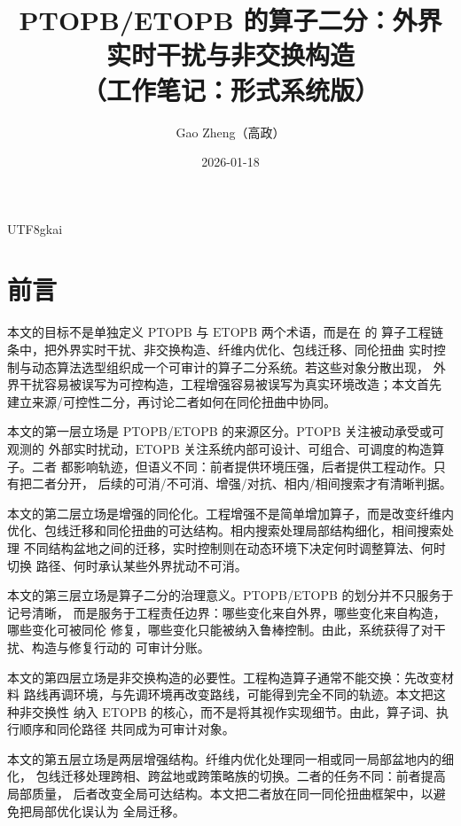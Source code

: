 \documentclass[12pt]{article}
\newcommand{\GFramework}{\text{G-Framework}}
\newcommand{\PTOPB}{\ensuremath{\mathrm{PTOPB}}}
\newcommand{\ETOPB}{\ensuremath{\mathrm{ETOPB}}}
\begin{document}
\begin{CJK*}{UTF8}{gkai}

\title{PTOPB/ETOPB 的算子二分：外界实时干扰与非交换构造\\（工作笔记：形式系统版）}
\author{Gao Zheng（高政）}
\date{2026-01-18}
\maketitle

\section*{前言}

本文的目标不是单独定义 \PTOPB{} 与 \ETOPB{} 两个术语，而是在 \GFramework{} 的
算子工程链条中，把外界实时干扰、非交换构造、纤维内优化、包线迁移、同伦扭曲
实时控制与动态算法选型组织成一个可审计的算子二分系统。若这些对象分散出现，
外界干扰容易被误写为可控构造，工程增强容易被误写为真实环境改造；本文首先
建立来源/可控性二分，再讨论二者如何在同伦扭曲中协同。

本文的第一层立场是 PTOPB/ETOPB 的来源区分。\PTOPB{} 关注被动承受或可观测的
外部实时扰动，\ETOPB{} 关注系统内部可设计、可组合、可调度的构造算子。二者
都影响轨迹，但语义不同：前者提供环境压强，后者提供工程动作。只有把二者分开，
后续的可消/不可消、增强/对抗、相内/相间搜索才有清晰判据。

本文的第二层立场是增强的同伦化。工程增强不是简单增加算子，而是改变纤维内
优化、包线迁移和同伦扭曲的可达结构。相内搜索处理局部结构细化，相间搜索处理
不同结构盆地之间的迁移，实时控制则在动态环境下决定何时调整算法、何时切换
路径、何时承认某些外界扰动不可消。

本文的第三层立场是算子二分的治理意义。PTOPB/ETOPB 的划分并不只服务于记号清晰，
而是服务于工程责任边界：哪些变化来自外界，哪些变化来自构造，哪些变化可被同伦
修复，哪些变化只能被纳入鲁棒控制。由此，系统获得了对干扰、构造与修复行动的
可审计分账。

本文的第四层立场是非交换构造的必要性。工程构造算子通常不能交换：先改变材料
路线再调环境，与先调环境再改变路线，可能得到完全不同的轨迹。本文把这种非交换性
纳入 \ETOPB{} 的核心，而不是将其视作实现细节。由此，算子词、执行顺序和同伦路径
共同成为可审计对象。

本文的第五层立场是两层增强结构。纤维内优化处理同一相或同一局部盆地内的细化，
包线迁移处理跨相、跨盆地或跨策略族的切换。二者的任务不同：前者提高局部质量，
后者改变全局可达结构。本文把二者放在同一同伦扭曲框架中，以避免把局部优化误认为
全局迁移。


\end{CJK*}
\end{document}
